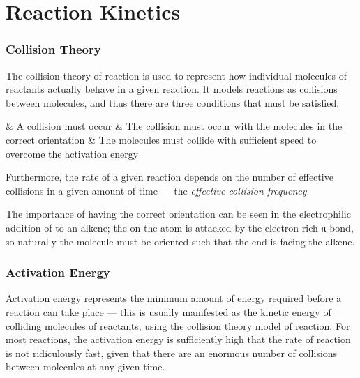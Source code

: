 
\pagebreak
\part{Reaction Kinetics}


	\section{Collision Theory}
		The collision theory of reaction is used to represent how individual molecules of reactants actually behave in a given reaction.
		It models reactions as collisions between molecules, and thus there are three conditions that must be satisfied:

		\begin{bulletlist}
			& A collision must occur
			& The collision must occur with the molecules in the correct orientation
			& The molecules must collide with sufficient speed to overcome the activation energy
		\end{bulletlist}

		Furthermore, the rate of a given reaction depends on the number of effective collisions in a given amount of time --- the
		\emph{effective collision frequency}.

		The importance of having the correct orientation can be seen in the electrophilic addition of  to an alkene; the \deltap
		on the  atom is attacked by the electron-rich π-bond, so naturally the  molecule must be oriented such that the 
		end is facing the alkene.




	\section{Activation Energy}

		Activation energy represents the minimum amount of energy required before a reaction can take place --- this is usually manifested as
		the kinetic energy of colliding molecules of reactants, using the collision theory model of reaction. For most reactions, the activation
		energy is sufficiently high that the rate of reaction is not ridiculously fast, given that there are an enormous number of collisions
		between molecules at any given time.


